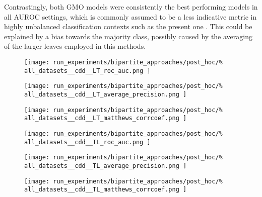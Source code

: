 Contrastingly, both GMO models were consistently the best performing models in all AUROC settings, which is commonly assumed to be a less indicative metric in highly unbalanced classification contexts such as the present one \cite{}. This could be explained by a bias towards the majority class, possibly caused by the averaging of the larger leaves employed in this methods. %

\begin{figure*}
    \centering
    \begin{subfigure}{0.32\textwidth}
        \texttt{[image: 
            run\_experiments/bipartite\_approaches/post\_hoc/\%
            all\_datasets\_\_cdd\_\_LT\_roc\_auc.png
        ]}
    \end{subfigure}
    \begin{subfigure}{0.32\textwidth}
        \texttt{[image: 
            run\_experiments/bipartite\_approaches/post\_hoc/\%
            all\_datasets\_\_cdd\_\_LT\_average\_precision.png
        ]}
    \end{subfigure}
    \begin{subfigure}{0.32\textwidth}
        \texttt{[image: 
            run\_experiments/bipartite\_approaches/post\_hoc/\%
            all\_datasets\_\_cdd\_\_LT\_matthews\_corrcoef.png
        ]}
    \end{subfigure}

    \begin{subfigure}{0.32\textwidth}
        \texttt{[image: 
            run\_experiments/bipartite\_approaches/post\_hoc/\%
            all\_datasets\_\_cdd\_\_TL\_roc\_auc.png
        ]}
    \end{subfigure}
    \begin{subfigure}{0.32\textwidth}
        \texttt{[image: 
            run\_experiments/bipartite\_approaches/post\_hoc/\%
            all\_datasets\_\_cdd\_\_TL\_average\_precision.png
        ]}
    \end{subfigure}
    \begin{subfigure}{0.32\textwidth}
        \texttt{[image: 
            run\_experiments/bipartite\_approaches/post\_hoc/\%
            all\_datasets\_\_cdd\_\_TL\_matthews\_corrcoef.png
        ]}
    \end{subfigure}


\end{figure*}

